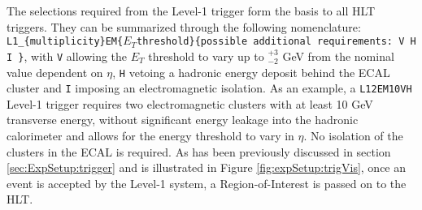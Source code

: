 The selections required from the Level-1 trigger form the basis to all \ac{HLT} triggers.  They can be summarized through the following nomenclature:\\
\texttt{L1\_\{multiplicity\}EM\{$E_T$threshold\}\{possible additional requirements: V H I \}},  with \texttt{V} allowing the $E_T$ threshold to vary up to $^{ +3}_{- 2}$ GeV from the nominal value dependent on $\eta$, \texttt{H} vetoing a hadronic energy deposit behind the \ac{ECAL} cluster and \texttt{I} imposing an electromagnetic isolation.  As an example,  a \texttt{L12EM10VH} Level-1 trigger requires two electromagnetic clusters with at least 10 GeV transverse energy,  without significant energy leakage into the hadronic calorimeter and allows for the energy threshold to vary in $\eta$.  No isolation of the clusters in the \ac{ECAL} is required. 
As has been previously discussed in section \ref{sec:ExpSetup:trigger} and is illustrated in Figure \ref{fig:expSetup:trigVis},  once an event is accepted by the Level-1 system,  a Region-of-Interest is passed on to the \ac{HLT}.
%

